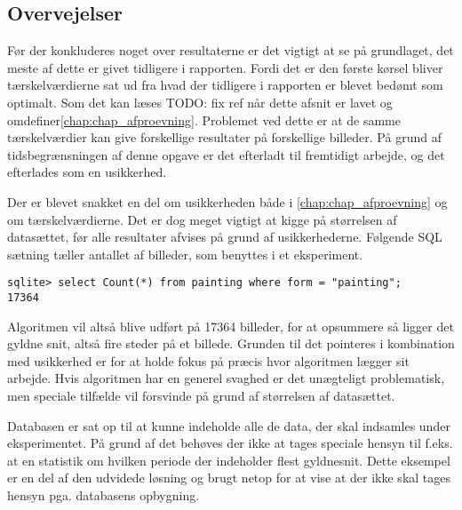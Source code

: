 {
\subsection{Overvejelser}
Før der konkluderes noget over resultaterne er det vigtigt at se på
grundlaget, det meste af dette er givet tidligere i rapporten.
Fordi det er den første kørsel bliver tærskelværdierne sat ud fra hvad
der tidligere i rapporten er blevet bedømt som optimalt.
Som det kan læses TODO: fix ref når dette afsnit er
lavet og omdefiner\ref{chap:chap_afproevning}.
Problemet ved dette er at de samme tærskelværdier kan give forskellige
resultater på forskellige billeder.
På grund af tidsbegrænsningen af denne opgave er det efterladt til
fremtidigt arbejde, og det efterlades som en usikkerhed.

Der er blevet snakket en del om usikkerheden både i
\ref{chap:chap_afproevning} og om tærskelværdierne.
Det er dog meget vigtigt at kigge på størrelsen af datasættet, før alle
resultater afvises på grund af usikkerhederne.
Følgende SQL sætning tæller antallet af billeder, som benyttes i et
eksperiment.
\begin{verbatim}
sqlite> select Count(*) from painting where form = "painting";
17364
\end{verbatim}
Algoritmen vil altså blive udført på 17364 billeder, for at opsummere så
ligger det gyldne snit, altså fire steder på et billede. Grunden til det
pointeres i kombination med usikkerhed er for at holde fokus på præcis
hvor algoritmen lægger sit arbejde. Hvis algoritmen har en generel
svaghed er det unægteligt problematisk, men speciale tilfælde vil
forsvinde på grund af størrelsen af datasættet.

Databasen er sat op til at kunne indeholde alle de data, der skal
indsamles under eksperimentet. På grund af det behøves der ikke at tages
speciale hensyn til f.eks. at en statistik om hvilken periode der indeholder
flest gyldnesnit. Dette eksempel er en del af den udvidede løsning og
brugt netop for at vise at der ikke skal tages hensyn pga. databasens
opbygning.

}
